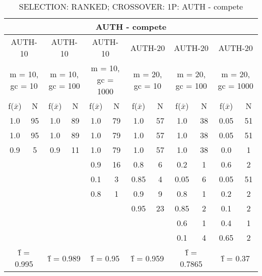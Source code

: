 \begin{table}[H]
	\centering
	\caption{SELECTION: RANKED; CROSSOVER: 1P: AUTH - compete}
	\begin{adjustbox}{width=1\textwidth}
		\begin{tabular}{ |c|c||c|c||c|c||c|c||c|c||c|c| }
			\hline
			\multicolumn{12}{|c|}{AUTH - compete} \\
			\hline
			\multicolumn{2}{|c||}{AUTH-10} & \multicolumn{2}{c||}{AUTH-10} & \multicolumn{2}{c||}{AUTH-10} & \multicolumn{2}{c||}{AUTH-20} & \multicolumn{2}{c||}{AUTH-20} & \multicolumn{2}{c|}{AUTH-20}\\
			\hline
			\multicolumn{2}{|c||}{m = 10, gc = 10} & \multicolumn{2}{c||}{m = 10, gc = 100} & \multicolumn{2}{c||}{m = 10, gc = 1000} & \multicolumn{2}{c||}{m = 20, gc = 10} & \multicolumn{2}{c||}{m = 20, gc = 100} & \multicolumn{2}{c|}{m = 20, gc = 1000}\\
			\hline
			f($\bar{x}$) & N & f($\bar{x}$) & N & f($\bar{x}$) & N & f($\bar{x}$) & N & f($\bar{x}$) & N & f($\bar{x}$) & N\\
			\hline
			\hline
			1.0 & 95 & 1.0 & 89 & 1.0 & 79 & 1.0 & 57 & 1.0 & 38 & 0.05 & 51\\
			\hline
			1.0 & 95 & 1.0 & 89 & 1.0 & 79 & 1.0 & 57 & 1.0 & 38 & 0.05 & 51\\
			0.9 & 5 & 0.9 & 11 & 1.0 & 79 & 1.0 & 57 & 1.0 & 38 & 0.0 & 1\\
			&   &   &   & 0.9 & 16 & 0.8 & 6 & 0.2 & 1 & 0.6 & 2\\
			&   &   &   & 0.1 & 3 & 0.85 & 4 & 0.05 & 6 & 0.05 & 51\\
			&   &   &   & 0.8 & 1 & 0.9 & 9 & 0.8 & 1 & 0.2 & 2\\
			&   &   &   &   &   & 0.95 & 23 & 0.85 & 2 & 0.1 & 2\\
			&   &   &   &   &   &   &   & 0.6 & 1 & 0.4 & 1\\
			&   &   &   &   &   &   &   & 0.1 & 4 & 0.65 & 2\\
			\hline
			\multicolumn{2}{|c||}{\^{f} = 0.995} & \multicolumn{2}{c||}{\^{f} = 0.989} & \multicolumn{2}{c||}{\^{f} = 0.95} & \multicolumn{2}{c||}{\^{f} = 0.959} & \multicolumn{2}{c||}{\^{f} = 0.7865} & \multicolumn{2}{c|}{\^{f} = 0.37}\\
			\hline
		\end{tabular}
	\end{adjustbox}
\end{table}
